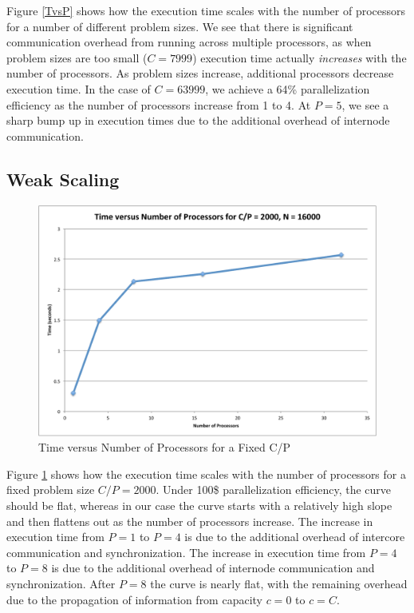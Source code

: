 \documentclass[11pt]{article} %
\begin{document}
Figure \ref{TvsP} shows how the execution time scales with the number of processors for a number of different problem sizes. We see that there is significant communication overhead from running across multiple processors, as when problem sizes are too small ($C = 7999$) execution time actually \emph{increases} with the number of processors. As problem sizes increase, additional processors decrease execution time. In the case of $C = 63999$, we achieve a 64\% parallelization efficiency as the number of processors increase from 1 to 4. At $P = 5$, we see a sharp bump up in execution times due to the additional overhead of internode communication.

\subsection{Weak Scaling}

\begin{figure}
\begin{centering}
\includegraphics[width=0.5\paperwidth]{figures/TvsP-fixed.pdf}
\caption{Time versus Number of Processors for a Fixed C/P}
\label{TvsP-fixed}
\end{centering}
\end{figure}

Figure \ref{TvsP-fixed} shows how the execution time scales with the number of processors for a fixed problem size $C/P = 2000$. Under 100\$ parallelization efficiency, the curve should be flat, whereas in our case the curve starts with a relatively high slope and then flattens out as the number of processors increase. The increase in execution time from $P = 1$ to $P = 4$ is due to the additional overhead of intercore communication and synchronization. The increase in execution time from $P = 4$ to $P = 8$ is due to the additional overhead of internode communication and synchronization. After $P = 8$ the curve is nearly flat, with the remaining overhead due to the propagation of information from capacity $c = 0$ to $c = C$.
\end{document}
